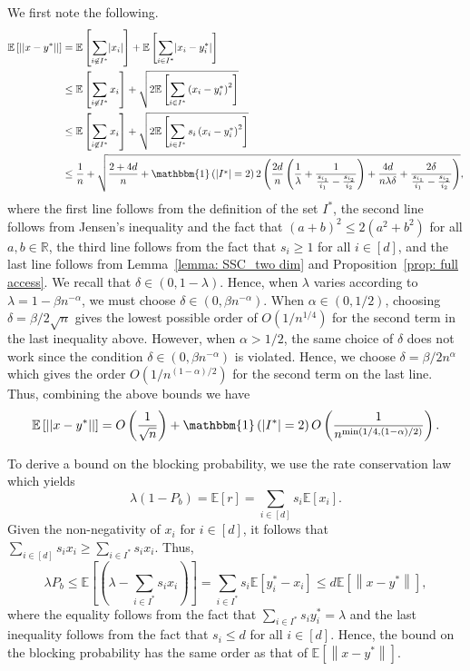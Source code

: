 \documentclass[a4paper]{article}
\def\ind{\mathbbm{1}}
\theoremstyle{plain}
\theoremstyle{definition}
\theoremstyle{case}
\theoremstyle{remark}
\newcommand{\norm}[1]{\left\lVert#1\right\rVert}
\newcommand{\mb}[1]{\mathbb{#1}}
\newcommand{\brac}[1]{\left(#1\right)}
\newcommand{\sbrac}[1]{\left[#1\right]}
\newcommand{\expect}[1]{\mathbb{E}\sbrac{#1}}
\newcommand{\abs}[1]{\lvert #1 \rvert}
\begin{document}
We first note the following.
\begin{align}
\expect{\vert \vert x - y^*\vert\vert} &= \expect{\sum_{ i\not\in I^*} \abs{x_i}} + \expect{\sum_{ i\in I^*} \abs{x_i - y^*_i}}\nonumber\\
& \leq \expect{\sum_{ i\not\in I^*} x_i} + \sqrt{2\expect{\sum_{ i\in I^*} \brac{x_i - y^*_i}^2}}\nonumber\\
&\leq \expect{\sum_{ i\not\in I^*} x_i} + \sqrt{2\expect{\sum_{ i\in I^*} s_i \brac{x_i - y^*_i}^2}}\nonumber\\
&\leq \frac{1}{n}+\sqrt{\frac{2+4d}{n}
+\ind\brac{\abs{I^*}=2}2\brac{\frac{2d}{n}\brac{\frac{1}{\lambda}+\frac{1}{\frac{s_{i_1}}{i_1}-\frac{s_{i_2}}{i_2}}}+\frac{4d}{n\lambda\delta}+\frac{2\delta}{\frac{s_{i_1}}{i_1}-\frac{s_{i_2}}{i_2}}}},\nonumber
\end{align}
%
where the first line follows from the definition of the set $I^*$, the second line follows from Jensen's inequality and the fact that $(a+b)^2\leq 2(a^2+b^2)$ for all $a,b\in \mb{R}$, the third line follows from the fact that $s_i \geq 1$ for all $i \in [d]$, and the last line follows from Lemma~\ref{lemma: SSC_two dim} and Proposition~\ref{prop: full access}. We recall that $\delta \in (0,1-\lambda)$.
Hence, when $\lambda$ varies according to $\lambda=1-\beta n^{-\alpha}$, we must choose $\delta \in (0, \beta n^{-\alpha})$. When $\alpha \in (0,1/2)$, choosing $\delta=\beta/2\sqrt{n}$ gives the lowest possible order of $O(1/n^{1/4})$ for the second term in the last inequality above. However, when $\alpha > 1/2$, the same choice of $\delta$ does not work since the condition $\delta \in (0, \beta n^{-\alpha})$ is violated. Hence, we choose $\delta=\beta/2n^{\alpha}$ which gives the order $O(1/n^{(1-\alpha)/2})$ for the second term on the last line. Thus, combining the above bounds we have
\begin{equation}
\expect{\vert \vert x - y^*\vert\vert}=O\brac{\frac{1}{\sqrt{n}}}+\ind\brac{\abs{I^*}=2}O\brac{\frac{1}{n^{\min(1/4,(1-\alpha)/2)}}}.
\end{equation}

%
To derive a bound on the blocking probability, we use the rate conservation law which yields 
\begin{equation}
    \lambda\brac{1- P_b} = \expect{r} = \sum_{i \in [d]} s_i\expect{x_i}.
\end{equation}
Given the non-negativity of $x_i$ for $i\in [d]$, it follows that $\sum_{i \in [d]} s_i x_i \geq \sum_{i \in I^*} s_i x_i$. Thus,
\begin{equation}
    \lambda P_b \leq \expect{\brac{\lambda - \sum_{i \in I^*}s_{i} x_{i}}} = \sum_{i \in I^*}s_{i} \expect{ y_i^* -x_{i}} \leq d \expect{\norm{x-y^*}},
\end{equation}
%
where the equality follows from the fact that $\sum_{ i\in I^*} s_i y_i^* = \lambda$ and the last inequality follows from the fact that $s_i\leq d$ for all $i \in [d]$. Hence, the bound on the blocking probability has the same order as that of $\expect{\norm{x-y^*}}$.
\end{document}
